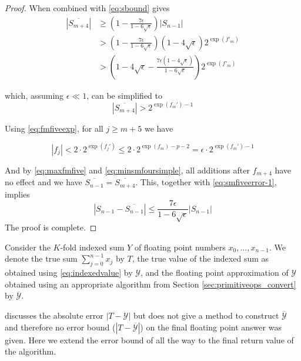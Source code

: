 \begin{proof}
      When combined with \eqref{eq:sbound} gives
      \begin{align*}
        \left|\overline{S_{m+4}}\right|
        & \geq \left(1-\frac{7 \epsilon}{1-6\sqrt{\epsilon}}\right) |S_{n-1}| \\
        & > \left(1-\frac{7 \epsilon}{1-6\sqrt{\epsilon}}\right) \left(1-4\sqrt{\epsilon}\right) 2^{\exp(f'_m)} \\
        & > \left(1-4\sqrt{\epsilon} - \frac{7 \epsilon \left(1-4\sqrt{\epsilon}\right)}{1-6\sqrt{\epsilon}}\right) 2^{\exp(f'_m)}
      \end{align*}

      which, assuming $\epsilon \ll 1$, can be simplified to
      \begin{equation}
        \left|\overline{S_{m + 4}}\right| > 2^{\exp(f_m') - 1}
        \label{eq:minsmfoursimple}
      \end{equation}

      Using  \eqref{eq:fmfiveexp}, for all $j \geq m + 5$ we have

      \begin{equation}
        |f_j| < 2 \cdot 2^{\exp(f_j')} \leq 2 \cdot 2^{\exp(f_m) - p - 2} = \epsilon \cdot 2^{\exp(f_m') - 1}
        \label{eq:maxfmfive}
      \end{equation}

      And by \eqref{eq:maxfmfive} and \eqref{eq:minsmfoursimple}, all additions after $f_{m + 4}$ have no effect and we have $\overline{S_{n-1}} = \overline{S_{m+4}}$.
      This, together with \eqref{eq:smfiveerror-1}, implies
      \begin{equation*}
        \left|S_{n-1} - \overline{S_{n-1}}\right| \leq \frac{7\epsilon}{1-6\sqrt{\epsilon}} |S_{n-1}|
      \end{equation*}
      The proof is complete.
    \end{proof}

    Consider the $K$-fold indexed sum $Y$ of floating point numbers $x_0, ..., x_{n - 1}$. We denote the true sum $\sum \limits_{j = 0}^{n - 1} x_j$ by $T$, the true value of the indexed sum as obtained using  \eqref{eq:indexedvalue} by $\mathcal{Y}$, and the floating point approximation of $\mathcal{Y}$ obtained using an appropriate algorithm from Section \ref{sec:primitiveops_convert} by $\overline{\mathcal{Y}}$.

    \cite{repsum} discusses the absolute error $|T - \mathcal{Y}|$ but does not give a method to construct $\overline{\mathcal{Y}}$ and therefore no error bound ($|T - \overline{\mathcal{Y}}|$) on the final floating point answer was given. Here we extend the error bound of \cite{repsum} all the way to the final return value of the algorithm.

